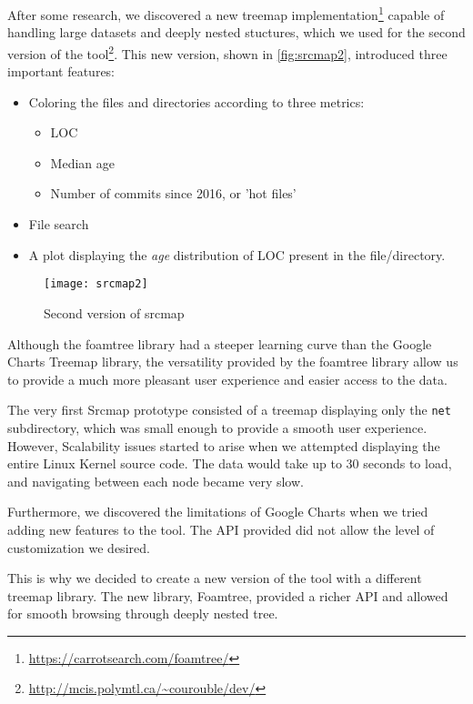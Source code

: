 After some research, we discovered a new treemap implementation\footnote{\url{https://carrotsearch.com/foamtree/}} capable of handling large datasets and deeply nested stuctures, which we used for the second version of the tool\footnote{\url{http://mcis.polymtl.ca/~courouble/dev/}}. This new version, shown in \autoref{fig:srcmap2}, introduced three important features: 
\begin{itemize}
	\item Coloring the files and directories according to three metrics:
	\begin{itemize}
		\item \ac{LOC}
		\item Median age
		\item Number of commits since 2016, or 'hot files'
	\end{itemize}
	\item File search
	\item A plot displaying the \textit{age} distribution of \ac{LOC} present in the file/directory.
\end{itemize}

\begin{figure}[htb]
\centering
\texttt{[image: srcmap2]}
\caption{Second version of srcmap}
\label{fig:srcmap2}
\end{figure}

Although the foamtree library had a steeper learning curve than the Google Charts Treemap library, the versatility provided by the foamtree library allow us to provide a much more pleasant user experience and easier access to the data.


The very first Srcmap prototype consisted of a treemap displaying only the \texttt{net} subdirectory, which was small enough to provide a smooth user experience. However, Scalability issues started to arise when we attempted displaying the entire Linux Kernel source code. The data would take up to 30 seconds to load, and navigating between each node became very slow.


Furthermore, we discovered the limitations of Google Charts when we tried adding new features to the tool. The API provided did not allow the level of customization we desired. 


This is why we decided to create a new version of the tool with a different treemap library. The new library, Foamtree, provided a richer API and allowed for smooth browsing through deeply nested tree.





